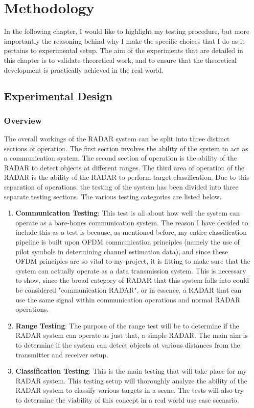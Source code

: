\documentclass[class=report,11pt,crop=false]{standalone}
\begin{document}
\chapter{Methodology \label{ch:methodology}}
In the following chapter, I would like to highlight my testing procedure, but more importantly the reasoning behind why I make the specific choices that I do as it pertains to experimental setup. The aim of the experiments that are detailed in this chapter is to validate theoretical work, and to ensure that the theoretical development is practically achieved in the real world.

\section{Experimental Design}
\subsection{Overview}
The overall workings of the RADAR system can be split into three distinct sections of operation. The first section involves the ability of the system to act as a communication system. The second section of operation is the ability of the RADAR to detect objects at different ranges. The third area of operation of the RADAR is the ability of the RADAR to perform target classification. Due to this separation of operations, the testing of the system has been divided into three separate testing sections. The various testing categories are listed below. 

\begin{enumerate}
    \item \textbf{Communication Testing}: This test is all about how well the system can operate as a bare-bones communication system. The reason I have decided to include this as a test is because, as mentioned before, my entire classification pipeline is built upon OFDM communication principles (namely the use of pilot symbols in determining channel estimation data), and since these OFDM principles are so vital to my project, it is fitting to make sure that the system can actually operate as a data transmission system. This is necessary to show, since the broad category of RADAR that this system falls into could be considered "communication RADAR", or in essence, a RADAR that can use the same signal within communication operations and normal RADAR operations.
    \item \textbf{Range Testing}: The purpose of the range test will be to determine if the RADAR system can operate as just that, a simple RADAR. The main aim is to determine if the system can detect objects at various distances from the transmitter and receiver setup.
    \item \textbf{Classification Testing}: This is the main testing that will take place for my RADAR system. This testing setup will thoroughly analyze the ability of the RADAR system to classify various targets in a scene. The tests will also try to determine the viability of this concept in a real world use case scenario.
\end{enumerate}
\end{document}
